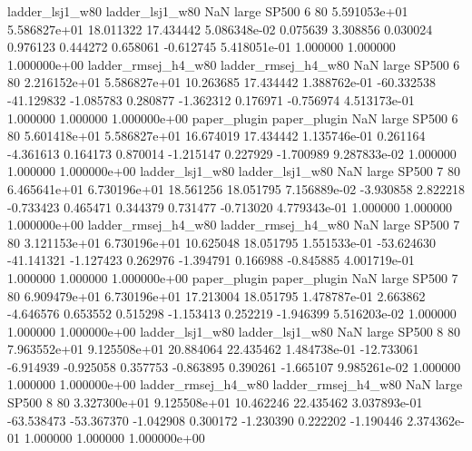     ladder_lsj1_w80     ladder_lsj1_w80                   NaN      large    SP500                 6 80 5.591053e+01   5.586827e+01     18.011322      17.434442  5.086348e-02      0.075639      3.308856     0.030024       0.976123  0.444272   0.658061    -0.612745   5.418051e-01            1.000000        1.000000        1.000000e+00
ladder_rmsej_h4_w80 ladder_rmsej_h4_w80                   NaN      large    SP500                 6 80 2.216152e+01   5.586827e+01     10.263685      17.434442  1.388762e-01    -60.332538    -41.129832    -1.085783       0.280877 -1.362312   0.176971    -0.756974   4.513173e-01            1.000000        1.000000        1.000000e+00
       paper_plugin        paper_plugin                   NaN      large    SP500                 6 80 5.601418e+01   5.586827e+01     16.674019      17.434442  1.135746e-01      0.261164     -4.361613     0.164173       0.870014 -1.215147   0.227929    -1.700989   9.287833e-02            1.000000        1.000000        1.000000e+00
    ladder_lsj1_w80     ladder_lsj1_w80                   NaN      large    SP500                 7 80 6.465641e+01   6.730196e+01     18.561256      18.051795  7.156889e-02     -3.930858      2.822218    -0.733423       0.465471  0.344379   0.731477    -0.713020   4.779343e-01            1.000000        1.000000        1.000000e+00
ladder_rmsej_h4_w80 ladder_rmsej_h4_w80                   NaN      large    SP500                 7 80 3.121153e+01   6.730196e+01     10.625048      18.051795  1.551533e-01    -53.624630    -41.141321    -1.127423       0.262976 -1.394791   0.166988    -0.845885   4.001719e-01            1.000000        1.000000        1.000000e+00
       paper_plugin        paper_plugin                   NaN      large    SP500                 7 80 6.909479e+01   6.730196e+01     17.213004      18.051795  1.478787e-01      2.663862     -4.646576     0.653552       0.515298 -1.153413   0.252219    -1.946399   5.516203e-02            1.000000        1.000000        1.000000e+00
    ladder_lsj1_w80     ladder_lsj1_w80                   NaN      large    SP500                 8 80 7.963552e+01   9.125508e+01     20.884064      22.435462  1.484738e-01    -12.733061     -6.914939    -0.925058       0.357753 -0.863895   0.390261    -1.665107   9.985261e-02            1.000000        1.000000        1.000000e+00
ladder_rmsej_h4_w80 ladder_rmsej_h4_w80                   NaN      large    SP500                 8 80 3.327300e+01   9.125508e+01     10.462246      22.435462  3.037893e-01    -63.538473    -53.367370    -1.042908       0.300172 -1.230390   0.222202    -1.190446   2.374362e-01            1.000000        1.000000        1.000000e+00
